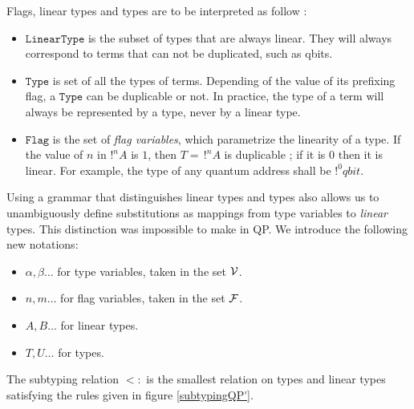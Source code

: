 Flags, linear types and types are to be interpreted as follow :
\begin{itemize}
	\item $\texttt{LinearType}$ is the subset of types that are always linear. They will always correspond to terms that can not be duplicated, such as qbits.
	\item $\texttt{Type}$ is set of all the types of terms. Depending of the value of its prefixing flag, a $\texttt{Type}$ can be duplicable or not. In practice, the type of a term will always be represented by a type, never by a linear type.
	\item $\texttt{Flag}$ is the set of \textit{flag variables}, which parametrize the linearity of a type. If the value of $n$ in $!^n A$ is $1$, then $T = \,!^n A$ is duplicable ; if it is $0$ then it is linear. For example, the type of any quantum address shall be $!^0 qbit$.
\end{itemize}
Using a grammar that distinguishes linear types and types also allows us to unambiguously define substitutions as mappings from type variables to \textit{linear} types. This distinction was impossible to make in QP. We introduce the following new notations:
\begin{itemize}
	\item $\alpha, \beta \dots$ for type variables, taken in the set $\mathcal{V}$.
	\item $n, m \dots$ for flag variables, taken in the set $\mathcal{F}$.
	\item $A, B \dots$ for linear types.
	\item $T, U \dots$ for types.
\end{itemize}

\begin{defn} The subtyping relation $<:$ is the smallest relation on types and linear types satisfying the rules given in figure \ref{subtypingQP'}.
\end{defn}

